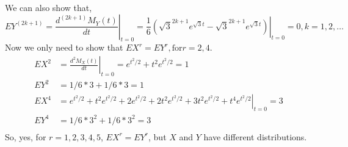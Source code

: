 \documentclass[letterpaper]{article}
\newcommand{\mgf}{M_X(t)}
\begin{document}
    We can also show that,
    \[ 
    EY^(2k+1) = \left. \frac{d^{(2k+1)} M_Y(t)}{dt}\right|_{t=0} = 
    \left.\frac{1}{6}\left(\sqrt{3}^{2k+1}e^{\sqrt{3}t}-\sqrt{3}^{2k+1}e^{\sqrt{3}t}\right) \right|_{t=0} = 0, k = 1, 2, \dots \]
    Now we only need to show that $EX^r = EY^r, \text{for} r = 2,4$.
    \begin{align*}
    EX^2 & = \left. \frac{d^2 \mgf}{dt} \right|_{t=0} = e^{t^2/2} + t^2 e^{t^2/2} = 1 \\
    EY^2 & = 1/6 * 3 + 1/6 * 3 = 1 \\
    EX^4 & = \left. e^{t^2/2} + t^2e^{t^2/2} + 2e^{t^2/2} + 2t^2e^{t^2/2} + 3t^2e^{t^2/2} + t^4e^{t^2/2} \right|_{t=0} = 3 \\
    EY^4 & = 1/6 * 3^2 + 1/6 * 3^2 = 3 \\
    \end{align*}
    So, yes, for $r=1,2,3,4,5$, $EX^r = EY^r$, but $X$ and $Y$ have different distributions.
    
\end{document}
